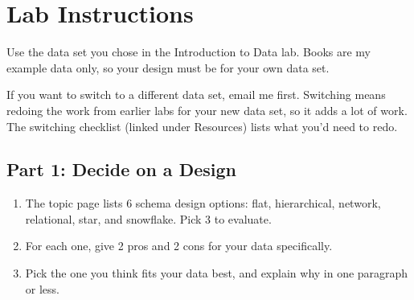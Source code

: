 \documentclass[12pt]{article}
\begin{document}
\section*{Lab Instructions}
Use the data set you chose in the Introduction to Data lab. Books are my example data only, so your design must be for your own data set.

If you want to switch to a different data set, email me first. Switching means redoing the work from earlier labs for your new data set, so it adds a lot of work. The switching checklist (linked under Resources) lists what you'd need to redo.

\subsection*{Part 1: Decide on a Design}
\begin{enumerate}
    \item The topic page lists 6 schema design options: flat, hierarchical, network, relational, star, and snowflake. Pick 3 to evaluate.
    \item For each one, give 2 pros and 2 cons for your data specifically.
    \item Pick the one you think fits your data best, and explain why in one paragraph or less.
\end{enumerate}
\end{document}
